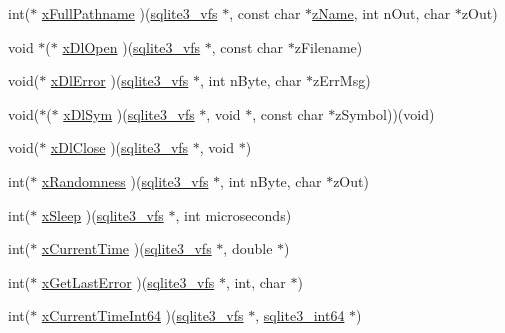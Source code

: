 \begin{DoxyCompactItemize}
\item 
int($\ast$ \mbox{\hyperlink{structsqlite3__vfs_ae6573ffda4c4f014960b0ec3a1522dfa}{x\+Full\+Pathname}} )(\mbox{\hyperlink{structsqlite3__vfs}{sqlite3\+\_\+vfs}} $\ast$, const char $\ast$\mbox{\hyperlink{structsqlite3__vfs_a0f06a27ac2201ea04c0623ef19e5d73e}{z\+Name}}, int n\+Out, char $\ast$z\+Out)
\item 
void $\ast$($\ast$ \mbox{\hyperlink{structsqlite3__vfs_a4de0324cd74c8ec98e4605d432f16e0a}{x\+Dl\+Open}} )(\mbox{\hyperlink{structsqlite3__vfs}{sqlite3\+\_\+vfs}} $\ast$, const char $\ast$z\+Filename)
\item 
void($\ast$ \mbox{\hyperlink{structsqlite3__vfs_ace296f3efa5d1a490c892069891f37c0}{x\+Dl\+Error}} )(\mbox{\hyperlink{structsqlite3__vfs}{sqlite3\+\_\+vfs}} $\ast$, int n\+Byte, char $\ast$z\+Err\+Msg)
\item 
void($\ast$($\ast$ \mbox{\hyperlink{structsqlite3__vfs_a847ba7d9a80164138031aacef1d01507}{x\+Dl\+Sym}} )(\mbox{\hyperlink{structsqlite3__vfs}{sqlite3\+\_\+vfs}} $\ast$, void $\ast$, const char $\ast$z\+Symbol))(void)
\item 
void($\ast$ \mbox{\hyperlink{structsqlite3__vfs_a0cbdab1584e0e2a80b32b2c335f17f99}{x\+Dl\+Close}} )(\mbox{\hyperlink{structsqlite3__vfs}{sqlite3\+\_\+vfs}} $\ast$, void $\ast$)
\item 
int($\ast$ \mbox{\hyperlink{structsqlite3__vfs_ac74c20a91cbd440ed72b11de4c4333ea}{x\+Randomness}} )(\mbox{\hyperlink{structsqlite3__vfs}{sqlite3\+\_\+vfs}} $\ast$, int n\+Byte, char $\ast$z\+Out)
\item 
int($\ast$ \mbox{\hyperlink{structsqlite3__vfs_abd36ce64a27bd6c1b57a6f2c7031ff65}{x\+Sleep}} )(\mbox{\hyperlink{structsqlite3__vfs}{sqlite3\+\_\+vfs}} $\ast$, int microseconds)
\item 
int($\ast$ \mbox{\hyperlink{structsqlite3__vfs_a925aa81bcf67f2daf50ad59de850ef41}{x\+Current\+Time}} )(\mbox{\hyperlink{structsqlite3__vfs}{sqlite3\+\_\+vfs}} $\ast$, double $\ast$)
\item 
int($\ast$ \mbox{\hyperlink{structsqlite3__vfs_ae90895f142cc41801f515ae5e339a3d7}{x\+Get\+Last\+Error}} )(\mbox{\hyperlink{structsqlite3__vfs}{sqlite3\+\_\+vfs}} $\ast$, int, char $\ast$)
\item 
int($\ast$ \mbox{\hyperlink{structsqlite3__vfs_a2a344dbc5e4625343d992546fbff5421}{x\+Current\+Time\+Int64}} )(\mbox{\hyperlink{structsqlite3__vfs}{sqlite3\+\_\+vfs}} $\ast$, \mbox{\hyperlink{sqlite3_8h_a0a4d3e6c1ad46f90e746b920ab6ca0d2}{sqlite3\+\_\+int64}} $\ast$)
\item 

\end{DoxyCompactItemize}
